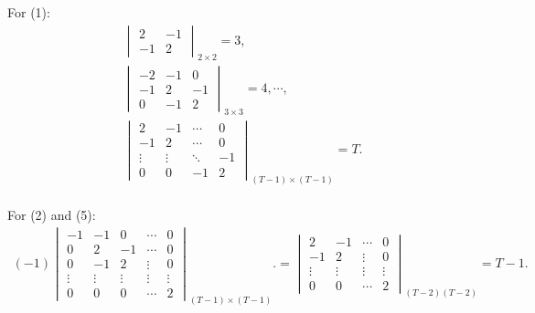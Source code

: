 \documentclass[12pt,a4paper,hyperref]{article}
\begin{document}
For (1):
\begin{align*}
& \begin{vmatrix}
2 & -1 \\
-1 & 2
\end{vmatrix}
_{2\times 2}
=3, \\
& \begin{vmatrix}
 -2 & -1 & 0  \\
  -1 & 2 & -1  \\
  0  & -1 & 2
\end{vmatrix}
_{3\times 3}
=4, \cdots ,\\
& \begin{vmatrix}
2      & -1     &    \cdots  &  0   \\
 -1     &  2     &     \cdots &  0   \\
\vdots & \vdots & \ddots     & -1 \\
 0     & 0      & -1         & 2
\end{vmatrix}
_{(T-1)\times (T-1)}
=T .\\
\end{align*}

For (2) and (5):
\begin{align*}
(-1)
\begin{vmatrix}
 -1     & -1      & 0      & \cdots    &0 \\
 0     & 2      & -1     &   \cdots  & 0 \\
  0     & -1     & 2      &  \vdots   &  0\\
 \vdots & \vdots & \vdots &   \vdots  & \vdots\\
   0    &  0     &   0    &   \cdots  &2
\end{vmatrix}
_{(T-1)\times (T-1)}.
=
\begin{vmatrix}
2      & -1     &   \cdots  & 0 \\
 -1    & 2      &  \vdots   &  0\\
\vdots & \vdots &   \vdots  & \vdots\\
 0     &   0    &   \cdots  &2
\end{vmatrix}
_{(T-2)(T-2)}=T-1.
\end{align*}
\end{document}
